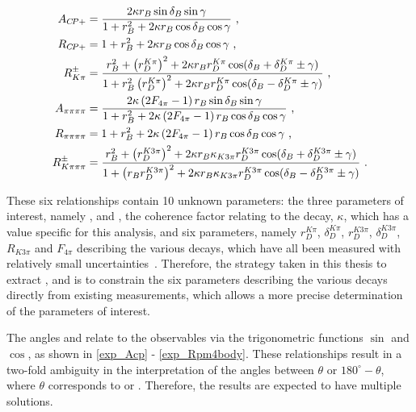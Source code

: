 \begin{align}
A_{{C\!P}+} &= \frac{2 \kappa r_B\sin\delta_B\sin\gamma}{1 + r_B^2 + 2 \kappa r_B\cos\delta_B\cos\gamma} \text{ ,}
\label{exp_Acp} \\
R_{{C\!P}+} &= 1 + r_B^2 + 2 \kappa r_B\cos\delta_B\cos\gamma \text{ ,}
\label{exp_Rcp} \\
R^{\pm}_{K\pi} &= \frac{r_B^2 + \left(r_D^{K\pi}\right)^2 + 2\kappa r_B r_D^{K\pi} \cos(\delta_B + \delta_D^{K\pi} \pm \gamma)}{1 + r_B^2\left(r_D^{K\pi}\right)^2 + 2\kappa r_B r_D^{K\pi} \cos(\delta_B - \delta_D^{K\pi} \pm \gamma)} \text{ ,}
\label{exp_Rpm} \\
A_{\pi\pi\pi\pi} &= \frac{2 \kappa\left(2F_{4\pi} - 1\right) r_B\sin\delta_B\sin\gamma}{1 + r_B^2 + 2 \kappa\left(2F_{4\pi} - 1\right) r_B\cos\delta_B\cos\gamma} \text{ ,}
\label{exp_A4pi} \\
R_{\pi\pi\pi\pi} &= 1 + r_B^2 + 2 \kappa\left(2F_{4\pi} - 1\right) r_B\cos\delta_B\cos\gamma \text{ ,}
\label{exp_R4pi} \\
R^{\pm}_{K\pi\pi\pi} &= \frac{r_B^2 + \left(r_D^{K3\pi}\right)^2 + 2\kappa r_B \kappa_{K3\pi} r_D^{K3\pi} \cos(\delta_B + \delta_D^{K3\pi} \pm \gamma)}{1 + \left(r_Br_D^{K3\pi}\right)^2 + 2\kappa r_B \kappa_{K3\pi} r_D^{K3\pi} \cos(\delta_B - \delta_D^{K3\pi} \pm \gamma)} \text{ .}
\label{exp_Rpm4body}
\end{align}

These six relationships contain 10 unknown parameters: the three parameters of interest, namely \rb, \deltab and \Pgamma, the coherence factor relating to the \Bm decay, $\kappa$, which has a value specific for this analysis, and six parameters, namely $r_D^{K\pi}$, $\delta_D^{K\pi}$, $r_D^{K3\pi}$, $\delta_D^{K3\pi}$, $R_{K3\pi}$ and $F_{4\pi}$ describing the various \Dz decays, which have all been measured with relatively small uncertainties~\cite{charm4pi,charmk3pi,charmk3pi_errata,LHCb-PAPER-2015-057}. Therefore, the strategy taken in this thesis to extract \rb, \deltab and \Pgamma is to constrain the six parameters describing the various \Dz decays directly from existing measurements, which allows a more precise determination of the parameters of interest.

The angles \deltab and \Pgamma relate to the \CP observables via the trigonometric functions $\sin$ and $\cos$, as shown in \eqns\ref{exp_Acp} - \ref{exp_Rpm4body}. These relationships result in a two-fold ambiguity in the interpretation of the angles between $\theta$ or $180^{\circ} - \theta$, where $\theta$ corresponds to \deltab or \Pgamma. Therefore, the results are expected to have multiple solutions.


